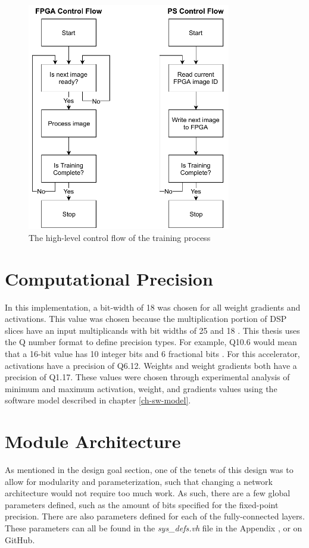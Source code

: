 \begin{figure}
	\centering 
	\includegraphics[width=3.5in]{figures/training_process_ps_pl}
	\caption{The high-level control flow of the training process}
	\label{ps-pl-training-process}
\end{figure}

\section{Computational Precision}
In this implementation, a bit-width of 18 was chosen for all weight gradients and activations. This value was chosen because the multiplication portion of DSP slices have an input multiplicands with bit widths of 25 and 18 . This thesis uses the Q number format to define precision types. For example, Q10.6 would mean that a 16-bit value has 10 integer bits and 6 fractional bits \cite{q-format}. For this accelerator, activations have a precision of Q6.12. Weights and weight gradients both have a precision of Q1.17. These values were chosen through experimental analysis of minimum and maximum activation, weight, and gradients values using the software model described in chapter \ref{ch-sw-model}.

\section{Module Architecture}
As mentioned in the design goal section, one of the tenets of this design was to allow for modularity and parameterization, such that changing a network architecture would not require too much work. As such, there are a few global parameters defined, such as the amount of bits specified for the fixed-point precision. There are also parameters defined for each of the fully-connected layers. These parameters can all be found in the \textit{sys\_defs.vh} file in the Appendix , or on GitHub. 

